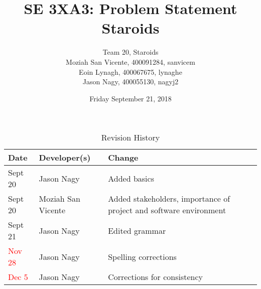 \documentclass{article}
\title{SE 3XA3: Problem Statement\\Staroids}
\author{Team 20, Staroids
		\\ Moziah San Vicente, 400091284, sanvicem
		\\ Eoin Lynagh, 400067675, lynaghe
		\\ Jason Nagy, 400055130, nagyj2
}
\date{Friday September 21, 2018}
\begin{document}
\begin{table}[hp]
\caption{Revision History} \label{TblRevisionHistory}
\begin{tabularx}{\textwidth}{llX}
\toprule
\textbf{Date} & \textbf{Developer(s)} & \textbf{Change}\\
\midrule
Sept 20 & Jason Nagy & Added basics\\
Sept 20 & Moziah San Vicente & Added stakeholders, importance of project and software environment\\
Sept 21 & Jason Nagy & Edited grammar\\
\textcolor{red}{Nov 28} & Jason Nagy & Spelling corrections\\
\textcolor{red}{Dec 5} & Jason Nagy & Corrections for consistency\\
\bottomrule
\end{tabularx}
\end{table}

\newpage

\maketitle
\end{document}
